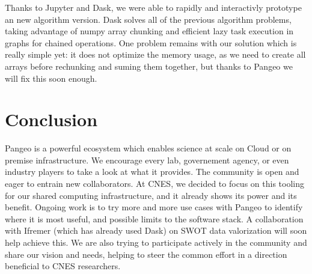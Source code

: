 \documentclass{article}
\begin{document}
Thanks to Jupyter and Dask, we were able to rapidly and interactivly prototype an new algorithm version. Dask solves all of the previous algorithm problems, taking advantage of numpy array chunking and efficient lazy task execution in graphs for chained operations. One problem remains with our solution which is really simple yet: it does not optimize the memory usage, as we need to create all arrays before rechunking and suming them together, but thanks to Pangeo we will fix this soon enough.

\section{Conclusion}
\label{sec:conclusion}

Pangeo is a powerful ecosystem which enables science at scale on Cloud or on premise infrastructure. We encourage every lab, governement agency, or even industry players to take a look at what it provides. The community is open and eager to entrain new collaborators.
At CNES, we decided to focus on this tooling for our shared computing infrastructure, and it already shows its power and its benefit. Ongoing work is to try more and more use cases with Pangeo to identify where it is most useful, and possible limits to the software stack. A collaboration with Ifremer (which has already used Dask\cite{b9}) on SWOT data valorization will soon help achieve this. We are also trying to participate  actively in the community and share our vision and needs, helping to steer the common effort in a direction beneficial to CNES researchers.







\small
\end{document}
